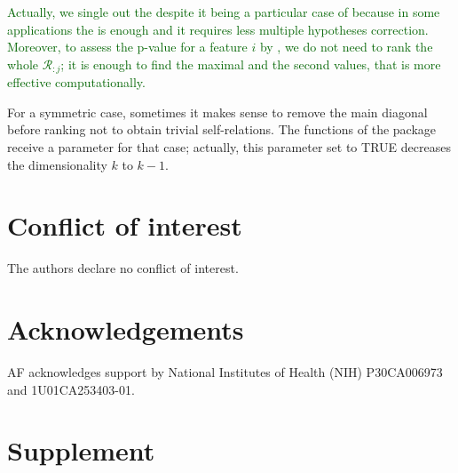 \documentclass{llncs}
\begin{document}
\textcolor{darkgreen}{Actually, we single out the  despite it being a particular case of  because in some applications the  is enough and it requires less multiple hypotheses correction. Moreover, to assess the p-value for a feature $i$ by , we do not need to rank the whole $\mathcal{R}_{:j}$; it is enough to find the maximal and the second values, that is more effective computationally.}

\textcolor{airforceblue}{For a symmetric case, sometimes it makes sense to remove the main diagonal before ranking not to obtain trivial self-relations. The functions of the package receive a parameter for that case; actually, this parameter set to TRUE decreases the dimensionality $k$ to $k-1$.}


\section{Conflict of interest}
The authors declare no conflict of interest.

\section{Acknowledgements}
AF acknowledges support by National Institutes of Health (NIH) P30CA006973 and 1U01CA253403-01.





\newcommand{\beginsupplement}{%
        \setcounter{table}{0}
        \renewcommand{\thetable}{S\arabic{table}}%
        \setcounter{figure}{0}
        \renewcommand{\thefigure}{S\arabic{figure}}
        \setcounter{equation}{0}
        \renewcommand{\theequation}{S\arabic{equation}}%
     }

\newpage
\section*{Supplement}
\beginsupplement
\end{document}
